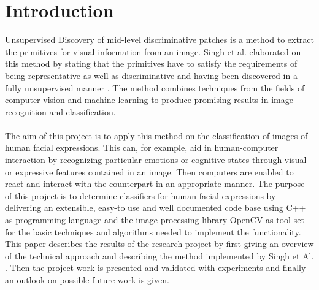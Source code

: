 
\section{Introduction}\label{sec:Introduction}

Unsupervised Discovery of mid-level discriminative patches is a method to extract the primitives for visual information from an image.  Singh et al. elaborated on this method by stating that the primitives have to satisfy the requirements of being representative as well as discriminative and having been discovered in a fully unsupervised manner \cite{Singh2012DiscPat}. The method combines techniques from the fields of computer vision and machine learning to produce promising results in image recognition and classification. 
\\
\\
The aim of this project is to apply this method on the classification of images of human facial expressions. This can, for example, aid in human-computer interaction by recognizing particular emotions or cognitive states through visual or expressive features contained in an image. Then computers are enabled to react and interact with the counterpart in an appropriate manner. The purpose of this project is to determine classifiers for human facial expressions by delivering an extensible, easy-to use and well documented code base using C++ as programming language and the image processing library OpenCV as tool set for the basic techniques and algorithms needed to implement the functionality. This paper describes the results of the research project by first giving an overview of the technical approach and describing the method implemented by Singh et Al. \cite{Singh2012DiscPat}. Then the project work is presented and validated with experiments and finally an outlook on possible future work is given.